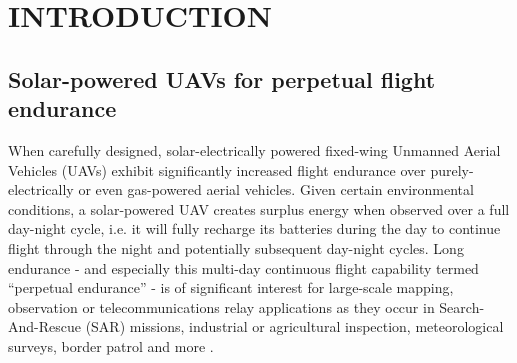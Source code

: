 \section{INTRODUCTION}

 \subsection{Solar-powered UAVs for perpetual flight endurance}
When carefully designed, solar-electrically powered fixed-wing Unmanned Aerial Vehicles (UAVs) exhibit significantly increased flight endurance over purely-electrically or even gas-powered aerial vehicles. Given certain environmental conditions, a solar-powered UAV creates surplus energy when observed over a full day-night cycle, i.e. it will fully recharge its batteries during the day to continue flight through the night and potentially subsequent day-night cycles. Long endurance - and especially this multi-day continuous flight capability termed ``perpetual endurance'' - is of significant interest for large-scale mapping, observation or telecommunications relay applications as they occur in Search-And-Rescue (SAR) missions, industrial or agricultural inspection, meteorological surveys, border patrol and more \cite{NASA_Pathfinder}.
 

